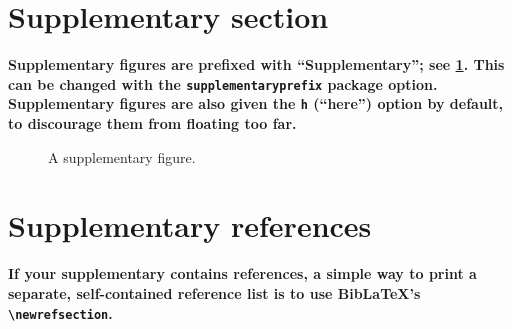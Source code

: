 \documentclass[twocolumn]{article}
\begin{document}
\lipsum[3]

\lipsum[3]

\section{Supplementary section}

\textbf{Supplementary figures are prefixed with ``Supplementary''; see \ref{fig:suppfig1}.
This can be changed with the \texttt{supplementaryprefix} package option.
Supplementary figures are also given the \texttt{h} (``here'') option by default, to discourage them from floating too far.
}

\begin{figure}
  \centering
  \fbox{\rule[-.5cm]{4cm}{4cm} \rule[-.5cm]{4cm}{0cm}}
  \caption{A supplementary figure.}
  \label{fig:suppfig1}
\end{figure}

\lipsum[3]

\lipsum[2]


\section{Supplementary references}

\textbf{If your supplementary contains references, a simple way to print a separate, self-contained reference list is to use BibLaTeX's \texttt{\textbackslash newrefsection}. }

\emergencystretch 4pt   %
\printbibliography

\end{document}
